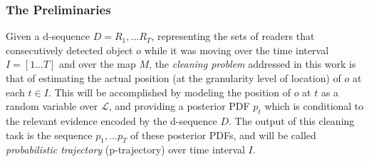 
\begin{frame}
\frametitle{The Preliminaries}

\begin{problem}
  Given a d-sequence $D = R_1,...R_T$, representing the sets of readers that consecutively detected object $o$ while it was moving over the time interval $I = [1...T]$ and over the map $M$, the \emph{cleaning problem} addressed in this work is that of estimating the actual position (at the granularity level of location) of $o$ at each $t \in I$. This will be accomplished by modeling the position of $o$ at $t$ as a random variable over $\mathcal{L}$, and providing a posterior PDF $p_t$ which is conditional to the relevant evidence encoded by the d-sequence $D$. The output of this cleaning task is the sequence $p_1,...p_T$ of these posterior PDFs, and will be called \emph{probabilistic trajectory} (p-trajectory) over time interval $I$.
\end{problem}

\end{frame}
